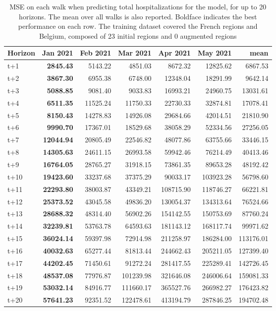 \begin{table}[H]
\centering
\caption{MSE on each walk when predicting total hospitalizations for the model, for up to 20 horizons. The mean over all walks is also reported. Boldface indicates the best performance on each row. The training dataset covered the French regions and Belgium, composed of 23 initial regions and 0 augmented regions }
\label{tab:MSE_walk_custom_linear_regression}
\begin{tabular}{lrrrrrr}
\toprule
Horizon &  Jan 2021 &  Feb 2021 &  Mar 2021 &  Apr 2021 &  May 2021 &      mean \\
\midrule
t+1  & \textbf{2845.43}  & 5143.22  & 4851.03  & 8672.32  & 12825.62  & 6867.53  \\
t+2  & \textbf{3867.30}  & 6955.38  & 6748.00  & 12348.04  & 18291.99  & 9642.14  \\
t+3  & \textbf{5088.85}  & 9081.40  & 9033.83  & 16993.21  & 24960.75  & 13031.61  \\
t+4  & \textbf{6511.35}  & 11525.24  & 11750.33  & 22730.33  & 32874.81  & 17078.41  \\
t+5  & \textbf{8150.43}  & 14278.83  & 14926.08  & 29684.66  & 42014.51  & 21810.90  \\
t+6  & \textbf{9990.70}  & 17367.01  & 18529.68  & 38058.29  & 52334.56  & 27256.05  \\
t+7  & \textbf{12044.94}  & 20805.49  & 22546.82  & 48077.86  & 63755.66  & 33446.15  \\
t+8  & \textbf{14305.63}  & 24611.15  & 26993.58  & 59942.46  & 76214.49  & 40413.46  \\
t+9  & \textbf{16764.05}  & 28765.27  & 31918.15  & 73861.35  & 89653.28  & 48192.42  \\
t+10  & \textbf{19423.60}  & 33237.68  & 37375.29  & 90033.17  & 103923.28  & 56798.60  \\
t+11  & \textbf{22293.80}  & 38003.87  & 43349.21  & 108715.90  & 118746.27  & 66221.81  \\
t+12  & \textbf{25373.52}  & 43045.58  & 49836.20  & 130054.37  & 134313.64  & 76524.66  \\
t+13  & \textbf{28688.32}  & 48314.40  & 56902.26  & 154142.55  & 150753.69  & 87760.24  \\
t+14  & \textbf{32239.81}  & 53763.78  & 64593.63  & 181143.12  & 168117.74  & 99971.62  \\
t+15  & \textbf{36024.14}  & 59397.98  & 72914.98  & 211258.97  & 186284.00  & 113176.01  \\
t+16  & \textbf{40032.63}  & 65277.44  & 81813.44  & 244662.43  & 205211.05  & 127399.40  \\
t+17  & \textbf{44202.45}  & 71450.61  & 91272.24  & 281417.55  & 225289.41  & 142726.45  \\
t+18  & \textbf{48537.08}  & 77976.87  & 101239.98  & 321646.08  & 246006.64  & 159081.33  \\
t+19  & \textbf{53032.14}  & 84916.77  & 111660.17  & 365527.76  & 266982.27  & 176423.82  \\
t+20  & \textbf{57641.23}  & 92351.52  & 122478.61  & 413194.79  & 287846.25  & 194702.48  \\

\bottomrule
\end{tabular}
\end{table}
